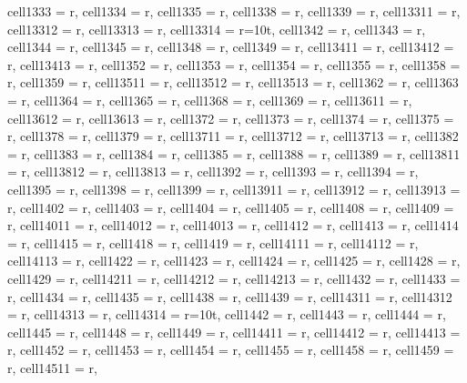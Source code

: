 \begin{landscape}
\begin{longtblr}[
  caption = {Changes in average values and effects differences significance from post hoc analysis.},
  label = {tab:appendix_LCBM_all_results_post_hocs}
]
{  cell{133}{3} = {r},
  cell{133}{4} = {r},
  cell{133}{5} = {r},
  cell{133}{8} = {r},
  cell{133}{9} = {r},
  cell{133}{11} = {r},
  cell{133}{12} = {r},
  cell{133}{13} = {r},
  cell{133}{14} = {r=10}{t},
  cell{134}{2} = {r},
  cell{134}{3} = {r},
  cell{134}{4} = {r},
  cell{134}{5} = {r},
  cell{134}{8} = {r},
  cell{134}{9} = {r},
  cell{134}{11} = {r},
  cell{134}{12} = {r},
  cell{134}{13} = {r},
  cell{135}{2} = {r},
  cell{135}{3} = {r},
  cell{135}{4} = {r},
  cell{135}{5} = {r},
  cell{135}{8} = {r},
  cell{135}{9} = {r},
  cell{135}{11} = {r},
  cell{135}{12} = {r},
  cell{135}{13} = {r},
  cell{136}{2} = {r},
  cell{136}{3} = {r},
  cell{136}{4} = {r},
  cell{136}{5} = {r},
  cell{136}{8} = {r},
  cell{136}{9} = {r},
  cell{136}{11} = {r},
  cell{136}{12} = {r},
  cell{136}{13} = {r},
  cell{137}{2} = {r},
  cell{137}{3} = {r},
  cell{137}{4} = {r},
  cell{137}{5} = {r},
  cell{137}{8} = {r},
  cell{137}{9} = {r},
  cell{137}{11} = {r},
  cell{137}{12} = {r},
  cell{137}{13} = {r},
  cell{138}{2} = {r},
  cell{138}{3} = {r},
  cell{138}{4} = {r},
  cell{138}{5} = {r},
  cell{138}{8} = {r},
  cell{138}{9} = {r},
  cell{138}{11} = {r},
  cell{138}{12} = {r},
  cell{138}{13} = {r},
  cell{139}{2} = {r},
  cell{139}{3} = {r},
  cell{139}{4} = {r},
  cell{139}{5} = {r},
  cell{139}{8} = {r},
  cell{139}{9} = {r},
  cell{139}{11} = {r},
  cell{139}{12} = {r},
  cell{139}{13} = {r},
  cell{140}{2} = {r},
  cell{140}{3} = {r},
  cell{140}{4} = {r},
  cell{140}{5} = {r},
  cell{140}{8} = {r},
  cell{140}{9} = {r},
  cell{140}{11} = {r},
  cell{140}{12} = {r},
  cell{140}{13} = {r},
  cell{141}{2} = {r},
  cell{141}{3} = {r},
  cell{141}{4} = {r},
  cell{141}{5} = {r},
  cell{141}{8} = {r},
  cell{141}{9} = {r},
  cell{141}{11} = {r},
  cell{141}{12} = {r},
  cell{141}{13} = {r},
  cell{142}{2} = {r},
  cell{142}{3} = {r},
  cell{142}{4} = {r},
  cell{142}{5} = {r},
  cell{142}{8} = {r},
  cell{142}{9} = {r},
  cell{142}{11} = {r},
  cell{142}{12} = {r},
  cell{142}{13} = {r},
  cell{143}{2} = {r},
  cell{143}{3} = {r},
  cell{143}{4} = {r},
  cell{143}{5} = {r},
  cell{143}{8} = {r},
  cell{143}{9} = {r},
  cell{143}{11} = {r},
  cell{143}{12} = {r},
  cell{143}{13} = {r},
  cell{143}{14} = {r=10}{t},
  cell{144}{2} = {r},
  cell{144}{3} = {r},
  cell{144}{4} = {r},
  cell{144}{5} = {r},
  cell{144}{8} = {r},
  cell{144}{9} = {r},
  cell{144}{11} = {r},
  cell{144}{12} = {r},
  cell{144}{13} = {r},
  cell{145}{2} = {r},
  cell{145}{3} = {r},
  cell{145}{4} = {r},
  cell{145}{5} = {r},
  cell{145}{8} = {r},
  cell{145}{9} = {r},
  cell{145}{11} = {r},
}
\end{longtblr}
\end{landscape}
